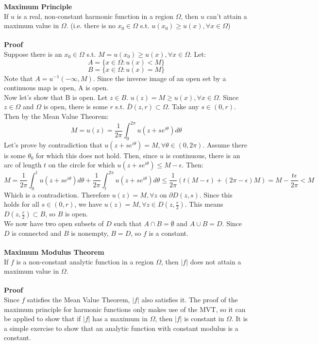 \documentclass[12 pt]{article}
\begin{document}
\textbf{Maximum Principle}
\\
If $u$ is a real, non-constant harmonic function in a region $\Omega$, then $u$ can't attain a maximum value in $\Omega$. (i.e. there is no $x_0\in \Omega$ s.t. $u(x_0)\geq u(x), \forall x\in \Omega$)
\\
\\
\textbf{Proof}
\\
Suppose there is an $x_0\in \Omega$ s.t. $M = u(x_0)\geq u(x), \forall x\in \Omega$. Let:
\[ A = \{x\in \Omega : u(x)<M \} \]
\[ B = \{x\in \Omega : u(x)=M \} \]
Note that $A = u^{-1} (-\infty, M) $. Since the inverse image of an open set by a continuous map is open, A is open.
\\
Now let's show that B is open. Let $z\in B$. $u(z) = M \geq u(x), \forall x\in \Omega$. Since $z\in \Omega$ and $\Omega$ is open, there is some $r$ s.t. $\bar D(z,r) \subset \Omega$. Take any $s\in (0,r)$. Then by the Mean Value Theorem:
\[ M = u(z) = \frac{1}{2\pi} \int^{2\pi}_0 u(z+s e^{i\theta}) d\theta \]
Let's prove by contradiction that $u(z+s e^{i\theta}) = M, \forall \theta \in (0,2\pi)$. Assume there is some $\theta_0$ for which this does not hold. Then, since $u$ is continuous, there is an arc of length $t$ on the circle for which $u(z+s e^{i\theta}) \leq M-\epsilon$. Then:
\[ M = \frac{1}{2\pi} \int^{t}_0 u(z+s e^{i\theta}) d\theta + \frac{1}{2\pi} \int^{2\pi}_t u(z+s e^{i\theta}) d\theta \leq \frac{1}{2\pi}(t(M-\epsilon) + (2\pi-\epsilon)M) = M-\frac{t\epsilon}{2\pi} < M\]
Which is a contradiction. Therefore $u(z) = M, \forall z$ on $\partial D(z,s)$. Since this holds for all $s\in (0,r)$, we have $u(z) = M, \forall z \in D(z, \frac{r}{2})$. This means $D(z, \frac{r}{2}) \subset B$, so $B$ is open.
\\
We now have two open subsets of $D$ such that $A\cap B = \emptyset$ and $A \cup B = D$. Since $D$ is connected and $B$ is nonempty, $B = D$, so $f$ is a constant.
\\
\\
\textbf{Maximum Modulus Theorem}
\\
If $f$ is a non-constant analytic function in a region $\Omega$, then $|f|$ does not attain a maximum value in $\Omega$. 
\\
\\
\textbf{Proof}
\\
Since $f$ satisfies the Mean Value Theorem, $|f|$ also satisfies it. The proof of the maximum principle for harmonic functions only makes use of the MVT, so it can be applied to show that if $|f|$ has a maximum in $\Omega$, then $|f|$ is constant in $\Omega$. It is a simple exercise to show that an analytic function with constant modulus is a constant.
\end{document}
